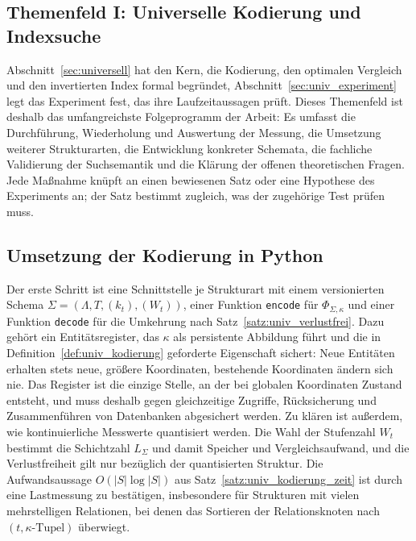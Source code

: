\documentclass[a4paper,12pt, twoside]{report}
\theoremstyle{definition}
\begin{document}
\subsection*{Themenfeld I: Universelle Kodierung und Indexsuche}

Abschnitt~\ref{sec:universell} hat den Kern, die Kodierung, den optimalen Vergleich und den invertierten Index formal begründet, Abschnitt~\ref{sec:univ_experiment} legt das Experiment fest, das ihre Laufzeitaussagen prüft. Dieses Themenfeld ist deshalb das umfangreichste Folgeprogramm der Arbeit: Es umfasst die Durchführung, Wiederholung und Auswertung der Messung, die Umsetzung weiterer Strukturarten, die Entwicklung konkreter Schemata, die fachliche Validierung der Suchsemantik und die Klärung der offenen theoretischen Fragen. Jede Maßnahme knüpft an einen bewiesenen Satz oder eine Hypothese des Experiments an; der Satz bestimmt zugleich, was der zugehörige Test prüfen muss.

\subsection{Umsetzung der Kodierung in Python}
\label{sec:ausb_univ_kodierung}

Der erste Schritt ist eine Schnittstelle je Strukturart mit einem versionierten Schema $\Sigma=(\Lambda,T,(k_t),(W_t))$, einer Funktion \texttt{encode} für $\Phi_{\Sigma,\kappa}$ und einer Funktion \texttt{decode} für die Umkehrung nach Satz~\ref{satz:univ_verlustfrei}. Dazu gehört ein Entitätsregister, das $\kappa$ als persistente Abbildung führt und die in Definition~\ref{def:univ_kodierung} geforderte Eigenschaft sichert: Neue Entitäten erhalten stets neue, größere Koordinaten, bestehende Koordinaten ändern sich nie. Das Register ist die einzige Stelle, an der bei globalen Koordinaten Zustand entsteht, und muss deshalb gegen gleichzeitige Zugriffe, Rücksicherung und Zusammenführen von Datenbanken abgesichert werden. Zu klären ist außerdem, wie kontinuierliche Messwerte quantisiert werden. Die Wahl der Stufenzahl $W_t$ bestimmt die Schichtzahl $L_\Sigma$ und damit Speicher und Vergleichsaufwand, und die Verlustfreiheit gilt nur bezüglich der quantisierten Struktur. Die Aufwandsaussage $O(|S|\log|S|)$ aus Satz~\ref{satz:univ_kodierung_zeit} ist durch eine Lastmessung zu bestätigen, insbesondere für Strukturen mit vielen mehrstelligen Relationen, bei denen das Sortieren der Relationsknoten nach $(t,\kappa\text{-Tupel})$ überwiegt.
\end{document}
